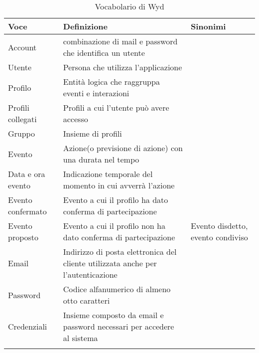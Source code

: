 \begin{longtable} {|P{3.5cm}|P{9cm}|P{3cm}|}
    \hline
    \textbf{Voce}     & \textbf{Definizione}                                                             & \textbf{Sinonimi}                 \\
    \hline
    \endhead
    Account           & combinazione di mail e password che identifica un utente                         &                                   \\
    \hline
    Utente            & Persona che utilizza l'applicazione                                              &                                   \\
    \hline
    Profilo           & Entità logica che raggruppa eventi e interazioni                                 &                                   \\
    \hline
    Profili collegati & Profili a cui l'utente può avere accesso                                         &                                   \\
    \hline
    Gruppo            & Insieme di profili                                                               &                                   \\
    \hline
    Evento            & Azione(o previsione di azione) con una durata nel tempo                          &                                   \\
    \hline
    Data e ora evento & Indicazione temporale del momento in cui avverrà l'azione                        &                                   \\
    \hline
    Evento confermato & Evento a cui il profilo ha dato conferma di partecipazione                       &                                   \\
    \hline
    Evento proposto   & Evento a cui il profilo non ha dato conferma di partecipazione                   & Evento disdetto, evento condiviso \\
    \hline
    Email             & Indirizzo di posta elettronica del cliente utilizzata anche per l'autenticazione &                                   \\
    \hline
    Password          & Codice alfanumerico di almeno otto caratteri                                     &                                   \\
    \hline
    Credenziali       & Insieme composto da email e password necessari per accedere al sistema           &                                   \\
    \hline
    \caption{Vocabolario di Wyd}
\end{longtable}


